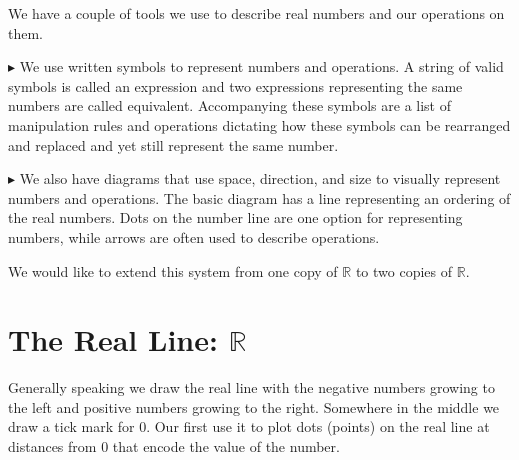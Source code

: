 \documentclass{ximera}
\begin{document}
We have a couple of tools we use to describe real numbers and our operations on them.


$\blacktriangleright$  We use written symbols to represent numbers and operations.  A string of valid symbols is called an expression and two expressions representing the same numbers are called equivalent. Accompanying these symbols are a list of manipulation rules and operations dictating how these symbols can be rearranged and replaced and yet still represent the same number.  


$\blacktriangleright$  We also have diagrams that use space, direction, and size to visually represent numbers and operations. The basic diagram has a line representing an ordering of the real numbers. Dots on the number line are one option for representing numbers, while arrows are often used to describe operations.


We would like to extend this system from one copy of \textbf{$\mathbb{R}$} to two copies of \textbf{$\mathbb{R}$}.








\section{The Real Line:  $\mathbb{R}$}





Generally speaking we draw the real line with the negative numbers growing to the left and positive numbers growing to the right. Somewhere in the middle we draw a tick mark for $0$. Our first use it to plot dots (points) on the real line at distances from $0$ that encode the value of the number.












  \begin{image}
  \end{image}
\end{document}
